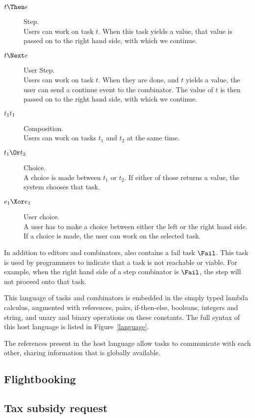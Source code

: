 \begin{description}
  \item[$t \Then e$] Step.\\
  Users can work on task $t$.
  When this task yields a value, that value is passed on to the right hand side, with which we continue.
  \item[$t \Next e$] User Step.\\
  Users can work on task $t$.
  When they are done, and $t$ yields a value, the user can send a continue event to the combinator.
  The value of $t$ is then passed on to the right hand side, with which we continue.
  \item[$t_1 \relax t_1$] Composition.\\
  Users can work on tasks $t_1$ and $t_2$ at the same time.
  \item[$t_1 \Or t_2$] Choice.\\
  A choice is made between $t_1$ or $t_2$. If either of those returns a value, the system chooses that task.
  \item[$e_1 \Xor e_1$] User choice.\\
  A user has to make a choice between either the left or the right hand side.
  If a choice is made, the user can work on the selected task.
\end{description}

In addition to editors and combinators, \TOPHAT also contains a fail task $\Fail$.
This task is used by programmers to indicate that a task is not reachable or viable.
For example, when the right hand side of a step combinator is $\Fail$, the step will not proceed onto that task.

This language of tasks and combinators is embedded in the simply typed lambda calculus, augmented with references, pairs, if-then-else, booleans, integers and string, and unary and binary operations on these constants.
The full syntax of this host language is listed in Figure~\ref{language}.

The references present in the host language allow tasks to communicate with each other,
sharing information that is globally available.

\subsection{Flightbooking}


\subsection{Tax subsidy request}
